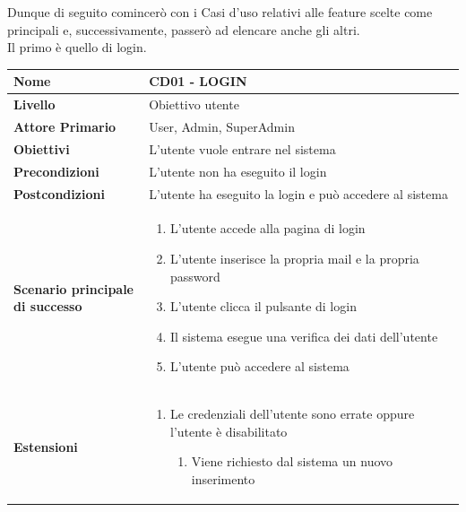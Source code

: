 Dunque di seguito comincerò con i Casi d'uso relativi alle feature scelte come principali e, successivamente, passerò ad elencare anche gli altri.
\\
Il primo è quello di login.

\begin{center}
    \begin{tabular}{|p{0.3\linewidth}|p{0.7\linewidth}|}
    \hline
    \rowcolor{Blue}
    \textbf{Nome} & CD01 - LOGIN \\
    \hline
    \rowcolor{DarkBlue}
    \textbf{Livello} & Obiettivo utente \\
    \hline
    \rowcolor{LightBlue}
    \textbf{Attore Primario} & User, Admin, SuperAdmin \\
    \hline
    \rowcolor{LightBlue}
    \textbf{Obiettivi} & L'utente vuole entrare nel sistema \\
    \hline
    \rowcolor{Blue}
    \textbf{Precondizioni} & L’utente non ha eseguito il login \\
    \hline
    \rowcolor{LightBlue}
    \textbf{Postcondizioni} & L’utente ha eseguito la login e può accedere al sistema \\
    \hline
    \rowcolor{LighterBlue}
    \begin{center}
        \textbf{Scenario principale di successo}
    \end{center}
    & 
    \begin{enumerate}
        \item L’utente accede alla pagina di login
        \item L’utente inserisce la propria mail e la propria password
        \item L’utente clicca il pulsante di login
        \item Il sistema esegue una verifica dei dati dell’utente
        \item L’utente può accedere al sistema
    \end{enumerate} \\
    \hline
    \rowcolor{LighterBlue}
    \begin{center}
        \textbf{Estensioni}
    \end{center} 
    &  
    \begin{enumerate}
        \item Le credenziali dell’utente sono errate oppure l’utente è disabilitato
        \begin{enumerate}
            \item Viene richiesto dal sistema un nuovo inserimento
        \end{enumerate}
    \end{enumerate}
    \\
    \hline
    \end{tabular}
\end{center}

